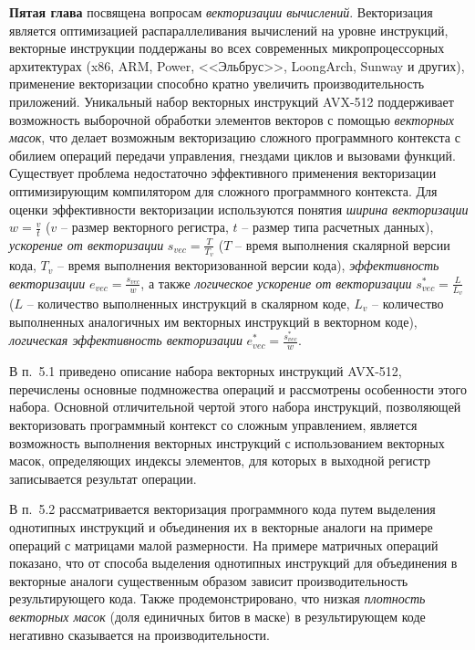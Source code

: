 \documentclass[a4paper,14pt]{extarticle}                     %
\theoremstyle{plain}                                         %
\begin{document}
\newpage
\textbf{Пятая глава} посвящена вопросам \textit{векторизации вычислений}.
Векторизация является оптимизацией распараллеливания вычислений на уровне инструкций, векторные инструкции поддержаны во всех современных микропроцессорных архитектурах (x86, ARM, Power, <<Эльбрус>>, LoongArch, Sunway и других), применение векторизации способно кратно увеличить производительность приложений.
Уникальный набор векторных инструкций AVX-512 поддерживает возможность выборочной обработки элементов векторов с помощью \textit{векторных масок}, что делает возможным векторизацию сложного программного контекста с обилием операций передачи управления, гнездами циклов и вызовами функций.
Существует проблема недостаточно эффективного применения векторизации оптимизирующим компилятором для сложного программного контекста.
Для оценки эффективности векторизации используются понятия \textit{ширина векторизации} $w = \frac{v}{t}$ ($v$ -- размер векторного регистра, $t$ -- размер типа расчетных данных), \textit{ускорение от векторизации} $s_{vec} = \frac{T}{T_v}$ ($T$ -- время выполнения скалярной версии кода, $T_v$ -- время выполнения векторизованной версии кода), \textit{эффективность векторизации} $e_{vec} = \frac{s_{vec}}{w}$, а также \textit{логическое ускорение от векторизации} $s_{vec}^{*} = \frac{L}{L_v}$ ($L$ -- количество выполненных инструкций в скалярном коде, $L_v$ -- количество выполненных аналогичных им векторных инструкций в векторном коде), \textit{логическая эффективность векторизации} $e_{vec}^{*} = \frac{s_{vec}^{*}}{w}$.


В п.~5.1 приведено описание набора векторных инструкций AVX-512, перечислены основные подмножества операций и рассмотрены особенности этого набора.
Основной отличительной чертой этого набора инструкций, позволяющей векторизовать программный контекст со сложным управлением, является возможность выполнения векторных инструкций с использованием векторных масок, определяющих индексы элементов, для которых в выходной регистр записывается результат операции.


В п.~5.2 рассматривается векторизация программного кода путем выделения однотипных инструкций и объединения их в векторные аналоги на примере операций с матрицами малой размерности.
На примере матричных операций показано, что от способа выделения однотипных инструкций для объединения в векторные аналоги существенным образом зависит производительность результирующего кода.
Также продемонстрировано, что низкая \textit{плотность векторных масок} (доля единичных битов в маске) в результирующем коде негативно сказывается на производительности.
\end{document}
